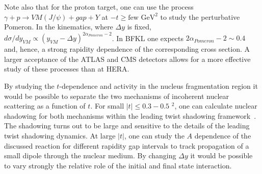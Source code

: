 \documentclass[../report.tex]{subfiles}
\begin{document}
Note also that for the proton target, one can use the process  $\gamma + p \to VM (J/\psi) + gap + Y$  at   
$-t \ge \mbox{few GeV}^2$ to study the perturbative Pomeron. 
In the kinematics, where $\Delta y$ is fixed, 
$d\sigma /dy_{VM} \propto (y_{VM}- \Delta y)^{2\alpha_{Pomeron}-2}$. In BFKL one expects
$2\alpha_{Pomeron}-2\sim 0.4$ and, hence, a strong rapidity dependence of the corresponding cross section. A larger acceptance of the ATLAS and CMS detectors allows for a more effective study of these processes than at HERA.


By studying the $t$-dependence and activity in the nucleus 
fragmentation region it would be possible to separate the two mechanisms of incoherent nuclear scattering as a function of $t$.
For small $|t| \le 0.3 - 0.5$ \UGeV$^2$, one can calculate nuclear shadowing for both mechanisms within the leading 
twist shadowing framework~\cite{Guzey:2013jaa}. The shadowing turns out to be large and sensitive to the details of the leading twist shadowing dynamics.  At large $|t|$, one can study the $A$ dependence of the discussed reaction for different rapidity gap  
intervals to track propagation of a small dipole through the nuclear medium.
 By changing $\Delta y$ it would be possible to vary  strongly the relative role of the initial and final state interaction.



\end{document}
